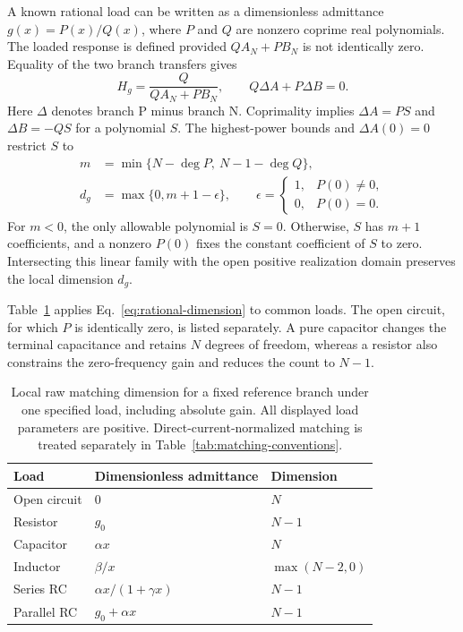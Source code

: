 A known rational load can be written as a dimensionless admittance $g(x)=P(x)/Q(x)$, where $P$ and $Q$ are nonzero coprime real polynomials. The loaded response is defined provided $QA_N+PB_N$ is not identically zero. Equality of the two branch transfers gives
\begin{equation}\label{eq:rational-kernel}
H_g=\frac{Q}{QA_N+PB_N},\qquad
Q\Delta A+P\Delta B=0.
\end{equation}
Here $\Delta$ denotes branch P minus branch N. Coprimality implies $\Delta A=PS$ and $\Delta B=-QS$ for a polynomial $S$. The highest-power bounds and $\Delta A(0)=0$ restrict $S$ to
\begin{equation}\label{eq:rational-dimension}
\begin{aligned}
m&=\min\{N-\deg P,\ N-1-\deg Q\},\\
d_g&=\max\{0,m+1-\epsilon\},\qquad
\epsilon=\begin{cases}1,&P(0)\ne0,\\0,&P(0)=0.\end{cases}
\end{aligned}
\end{equation}
For $m<0$, the only allowable polynomial is $S=0$. Otherwise, $S$ has $m+1$ coefficients, and a nonzero $P(0)$ fixes the constant coefficient of $S$ to zero. Intersecting this linear family with the open positive realization domain preserves the local dimension $d_g$.

Table~\ref{tab:load-dimensions} applies Eq.~\eqref{eq:rational-dimension} to common loads. The open circuit, for which $P$ is identically zero, is listed separately. A pure capacitor changes the terminal capacitance and retains $N$ degrees of freedom, whereas a resistor also constrains the zero-frequency gain and reduces the count to $N-1$.
\begin{table}[htbp]
\centering
\caption{Local raw matching dimension for a fixed reference branch under one specified load, including absolute gain. All displayed load parameters are positive. Direct-current-normalized matching is treated separately in Table~\ref{tab:matching-conventions}.}
\label{tab:load-dimensions}
\begin{tabular}{lll}
\toprule
Load & Dimensionless admittance & Dimension \\
\midrule
Open circuit & $0$ & $N$ \\
Resistor & $g_0$ & $N-1$ \\
Capacitor & $\alpha x$ & $N$ \\
Inductor & $\beta/x$ & $\max(N-2,0)$ \\
Series RC & $\alpha x/(1+\gamma x)$ & $N-1$ \\
Parallel RC & $g_0+\alpha x$ & $N-1$ \\
\bottomrule
\end{tabular}
\end{table}

